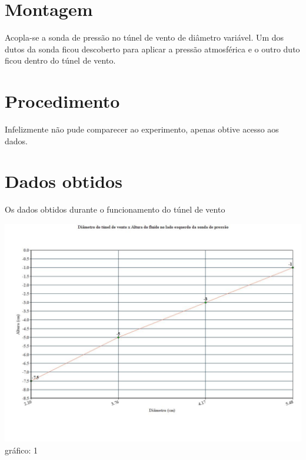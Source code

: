 \documentclass[a4paper]{article}
\begin{document}
\section{Montagem}
    Acopla-se a sonda de pressão no túnel de vento de diâmetro variável. Um dos dutos da sonda ficou descoberto para aplicar a pressão atmosférica e o outro duto ficou dentro do túnel de vento.

\section{Procedimento}
    Infelizmente não pude comparecer ao experimento, apenas obtive acesso aos dados.
    
\section{Dados obtidos}
    Os dados obtidos durante o funcionamento do túnel de vento
    \begin{center}
          \includegraphics[width=\linewidth]{img/graphHeight.jpg}
          \label{graph}{gráfico: 1}
    \end{center}
\end{document}
